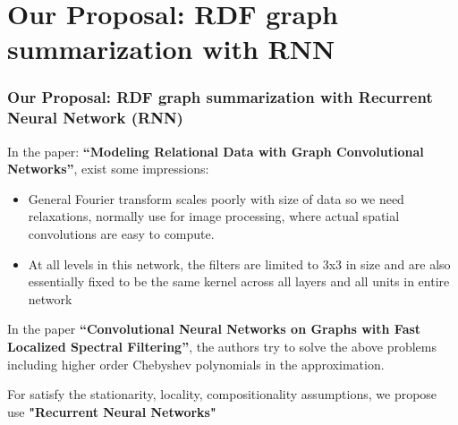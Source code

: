 \documentclass{beamer}
\numberwithin{figure}{section}
\numberwithin{equation}{section}
\begin{document}
\section{Our Proposal: RDF graph summarization with RNN}
\begin{frame} \scriptsize  \justifying
 \frametitle{Our Proposal: RDF graph summarization with Recurrent Neural Network (RNN)}

In the paper: \textbf{“Modeling Relational Data with Graph Convolutional Networks”}\cite{Schlichtkrull2017}, exist some impressions:
\begin{itemize} \justifying
        	
  			\item General Fourier transform scales poorly with size of data so we need relaxations, normally use for image processing, where actual spatial convolutions are easy to compute.
      		\vspace{2mm}
  			\item At all levels in this network, the filters are limited to 3x3 in size and are also essentially fixed to be the same kernel across all layers and all units in entire network 
            \end{itemize}

\vspace{3mm}
In the paper  \textbf{“Convolutional Neural Networks on Graphs with Fast Localized Spectral Filtering”}\citet{Bresson2016}, the authors try to solve the above problems including higher order Chebyshev polynomials in the approximation.

\vspace{3mm}
\begin{alertblock}{}\normalsize
\justify \setlength{\parskip}{-5mm}
  For satisfy the stationarity, locality, compositionality 	 assumptions, we propose use \textbf{"Recurrent Neural Networks"}
 \end{alertblock}
\end{frame}
\end{document}
